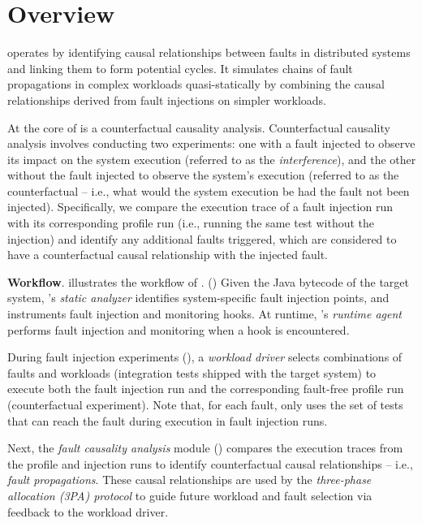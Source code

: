 \section{\tool Overview}
\label{sec:overview}




\tool operates by identifying causal relationships between faults in distributed systems and linking them to form potential cycles. It simulates 
chains of fault propagations 
in complex workloads quasi-statically by combining the causal relationships derived from fault injections on simpler workloads.

At the core of \tool is a counterfactual causality analysis. 
Counterfactual causality analysis involves conducting two experiments: 
one with a fault injected to observe its impact on the system execution (referred to as the \textit{interference}), 
and the other without the fault injected to observe the system's execution (referred to as the counterfactual -- i.e., what would the system execution be had the fault not been injected). 
Specifically, we compare the execution trace of a fault injection run with its corresponding profile run 
(i.e., running the same test without the injection) 
and identify any additional faults triggered, 
which are considered to have a counterfactual causal relationship 
with the injected fault.

\textbf{Workflow}. 
 illustrates the workflow of \tool.
() Given the Java bytecode of the target system, 
\tool's \textit{static analyzer} identifies 
system-specific fault injection points, 
and instruments fault injection and monitoring hooks. 
At runtime, 
\tool's \textit{runtime agent} 
performs fault injection and monitoring 
when a hook is encountered. 


During fault injection experiments (), 
a \textit{workload driver} selects combinations of faults and workloads 
(integration tests shipped with the target system) 
to execute both the fault injection run 
and the corresponding fault-free profile run (counterfactual experiment).
Note that, 
for each fault, 
\tool only uses the set of tests that 
can reach the fault during execution 
in fault injection runs. 


Next, the \textit{fault causality analysis} module () compares the execution traces from the profile and injection runs 
to identify counterfactual causal relationships 
-- i.e., \textit{fault propagations}. 
These causal relationships are used by the 
\textit{three-phase allocation (3PA) protocol} 
to guide future workload and fault selection 
via feedback to the workload driver.

